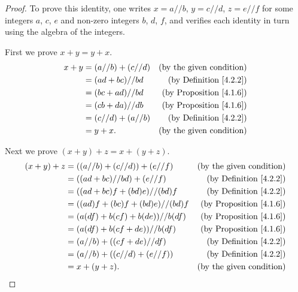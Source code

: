 \begin{proof}
    To prove this identity, one writes \(x = a // b\), \(y = c // d\), \(z = e // f\) for some integers \(a\), \(c\), \(e\) and non-zero integers \(b\), \(d\), \(f\), and verifies each identity in turn using the algebra of the integers.

    First we prove \(x + y = y + x\).
    \begin{align*}
        x + y & = (a // b) + (c // d) & \text{(by the given condition)}     \\
              & = (ad + bc) // bd     & \text{(by Definition \ref{4.2.2})}  \\
              & = (bc + ad) // bd     & \text{(by Proposition \ref{4.1.6})} \\
              & = (cb + da) // db     & \text{(by Proposition \ref{4.1.6})} \\
              & = (c // d) + (a // b) & \text{(by Definition \ref{4.2.2})}  \\
              & = y + x.              & \text{(by the given condition)}
    \end{align*}

    Next we prove \((x + y) + z = x + (y + z)\).
    \begin{align*}
        (x + y) + z & = ((a // b) + (c // d)) + (e // f) & \text{(by the given condition)}     \\
                    & = ((ad + bc) // bd) + (e // f)     & \text{(by Definition \ref{4.2.2})}  \\
                    & = ((ad + bc)f + (bd)e) // (bd)f    & \text{(by Definition \ref{4.2.2})}  \\
                    & = ((ad)f + (bc)f + (bd)e) // (bd)f & \text{(by Proposition \ref{4.1.6})} \\
                    & = (a(df) + b(cf) + b(de)) // b(df) & \text{(by Proposition \ref{4.1.6})} \\
                    & = (a(df) + b(cf + de)) // b(df)    & \text{(by Proposition \ref{4.1.6})} \\
                    & = (a // b) + ((cf + de) // df)     & \text{(by Definition \ref{4.2.2})}  \\
                    & = (a // b) + ((c // d) + (e // f)) & \text{(by Definition \ref{4.2.2})}  \\
                    & = x + (y + z).                     & \text{(by the given condition)}
    \end{align*}


\end{proof}
